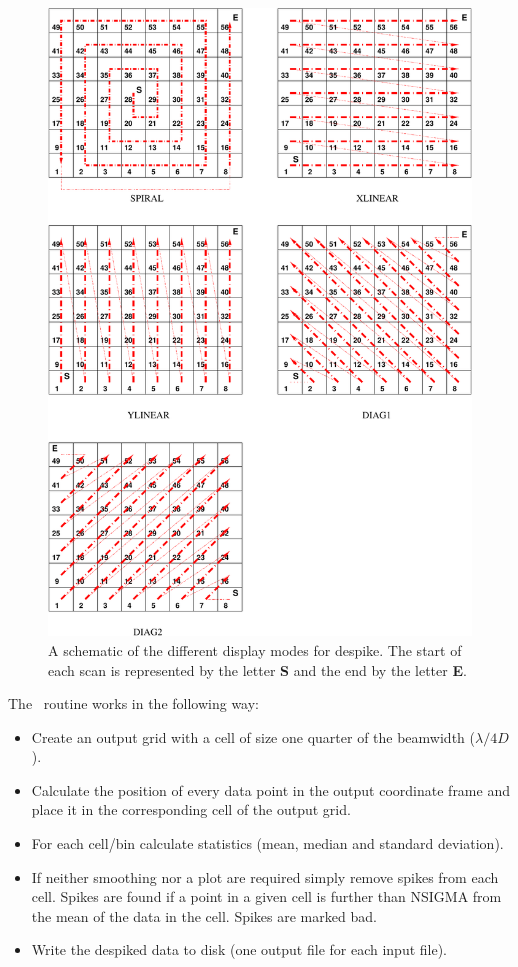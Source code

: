 \documentclass[twoside,11pt]{starlink}
\providecommand{\task}[1]{#1}
\providecommand{\despike}{\htmlref{\task{despike}}{DESPIKE}}
\begin{document}
\begin{figure}
\begin{center}
\includegraphics[width=5in]{sun216_despikemodes}
\caption{A schematic of the different display modes for \task{despike}. The
start of each scan is represented by the letter \textbf{S} and the end by the
letter \textbf{E}.}
\label{fig:despikemodes}
\end{center}
\end{figure}


  The \despike\ routine works in the following way:

\begin{itemize}
\item Create an output grid with a cell of size one quarter of the beamwidth ($\lambda/4D$).
\item Calculate the position of every data point in the output coordinate
           frame and place it in the corresponding cell of the output grid.
\item For each cell/bin calculate statistics (mean, median and standard
           deviation).
\item If neither smoothing nor a plot are required simply remove spikes
           from each cell. Spikes are found if a point in a given cell is
further than  NSIGMA from the mean of the data in the cell. Spikes are marked
bad.
\item Write the despiked data to disk (one output file for each input
           file).

\end{itemize}
\end{document}
